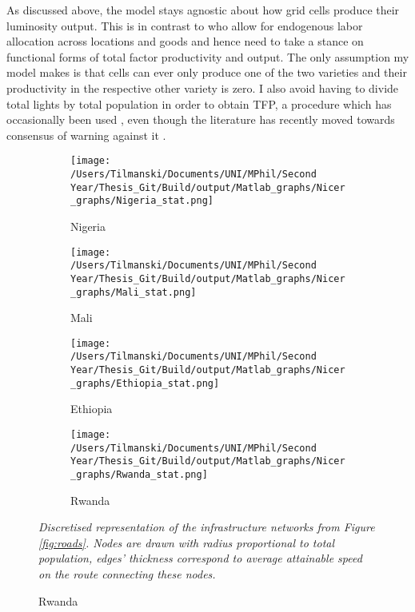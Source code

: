 \documentclass[11pt, oneside]{article}   	%
\newcommand{\mysubcaption}[1]{
\justify
\begin{spacing}{0.7}
\textit{\footnotesize #1}
\end{spacing}}
\begin{document}
As discussed above, the model stays agnostic about how grid cells produce their luminosity output. This is in contrast to \citeauthor{fajgelbaum_optimal_2017} who allow for endogenous labor allocation across locations and goods and hence need to take a stance on functional forms of total factor productivity and output. The only assumption my model makes is that cells can ever only produce one of the two varieties and their productivity in the respective other variety is zero. I also avoid having to divide total lights by total population in order to obtain TFP, a procedure which has occasionally been used \citep[see e.g.][]{DeLuca_Ethnicfavoritismaxiom_2018}, even though the literature has recently moved towards consensus of warning against it \citep{michalopoulos_spatial_2018}.

\begin{figure}[t]
\centering
\caption{Discretised Networks for different countries}

\begin{subfigure}[c]{0.45\textwidth}
\texttt{[image: /Users/Tilmanski/Documents/UNI/MPhil/Second Year/Thesis\_Git/Build/output/Matlab\_graphs/Nicer\_graphs/Nigeria\_stat.png]}
\caption{Nigeria}
\label{fig:nigeria_mat}
\end{subfigure}
\begin{subfigure}[c]{0.45\textwidth}
\texttt{[image: /Users/Tilmanski/Documents/UNI/MPhil/Second Year/Thesis\_Git/Build/output/Matlab\_graphs/Nicer\_graphs/Mali\_stat.png]}
\caption{Mali}
\label{fig:Mali_mat}
\end{subfigure}

\begin{subfigure}[c]{0.45\textwidth}
\texttt{[image: /Users/Tilmanski/Documents/UNI/MPhil/Second Year/Thesis\_Git/Build/output/Matlab\_graphs/Nicer\_graphs/Ethiopia\_stat.png]}
\caption{Ethiopia}
\label{fig:Ethiopia_mat}
\end{subfigure}
\begin{subfigure}[c]{0.45\textwidth}
\texttt{[image: /Users/Tilmanski/Documents/UNI/MPhil/Second Year/Thesis\_Git/Build/output/Matlab\_graphs/Nicer\_graphs/Rwanda\_stat.png]}
\caption{Rwanda}
\label{fig:Rwanda_mat}
\end{subfigure}
\mysubcaption{Discretised representation of the infrastructure networks from Figure \eqref{fig:roads}. Nodes are drawn with radius proportional to total population, edges' thickness correspond to average attainable speed on the route connecting these nodes.}
\label{fig:matlab_networks}
\end{figure}
\end{document}
